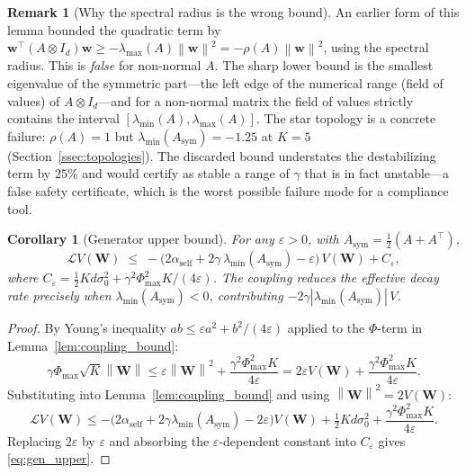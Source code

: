 \documentclass[12pt]{article}
\theoremstyle{plain}
\newtheorem{corollary}[theorem]{Corollary}
\theoremstyle{definition}
\newtheorem{remark}[theorem]{Remark}
\newcommand{\Lgen}{\mathcal{L}}
\newcommand{\W}{\mathbf{W}}
\newcommand{\norm}[1]{\left\lVert #1 \right\rVert}
\newcommand{\abs}[1]{\left| #1 \right|}
\begin{document}
\begin{remark}[Why the spectral radius is the wrong bound]
  \label{rem:fov}
  An earlier form of this lemma bounded the quadratic term by
  $\mathbf{w}^\top(A\otimes I_d)\mathbf{w}\geq-\lambda_{\max}(A)\norm{\mathbf{w}}^2
  =-\rho(A)\norm{\mathbf{w}}^2$, using the spectral radius. This is
  \emph{false} for non-normal $A$. The sharp lower bound is the smallest
  eigenvalue of the symmetric part---the left edge of the numerical range
  (field of values) of $A\otimes I_d$---and for a non-normal matrix the
  field of values strictly contains the interval
  $[\lambda_{\min}(A),\lambda_{\max}(A)]$. The star topology is a concrete
  failure: $\rho(A)=1$ but $\lambda_{\min}(A_{\mathrm{sym}})=-1.25$ at
  $K=5$ (Section~\ref{ssec:topologies}). The discarded bound understates
  the destabilizing term by $25\%$ and would certify as stable a range of
  $\gamma$ that is in fact unstable---a false safety certificate, which is
  the worst possible failure mode for a compliance tool.
\end{remark}

\begin{corollary}[Generator upper bound]
  \label{cor:gen_upper}
  For any $\varepsilon > 0$, with $A_{\mathrm{sym}}=\tfrac12(A+A^\top)$,
  \begin{equation}
    \Lgen V(\W) \;\leq\;
    -\bigl(2\alpha_{\mathrm{self}} + 2\gamma\, \lambda_{\min}(A_{\mathrm{sym}})
    - \varepsilon\bigr)\, V(\W) + C_\varepsilon,
    \label{eq:gen_upper}
  \end{equation}
  where $C_\varepsilon = \tfrac{1}{2}Kd\sigma_0^2
  + \gamma^2 \Phi_{\max}^2 K / (4\varepsilon)$.  The coupling
  \emph{reduces} the effective decay rate precisely when
  $\lambda_{\min}(A_{\mathrm{sym}})<0$, contributing
  $-2\gamma\abs{\lambda_{\min}(A_{\mathrm{sym}})}\,V$.
\end{corollary}

\begin{proof}
  By Young's inequality $ab \leq \varepsilon a^2 + b^2/(4\varepsilon)$
  applied to the $\Phi$-term in Lemma~\ref{lem:coupling_bound}:
  \[
    \gamma \Phi_{\max} \sqrt{K} \norm{\W}
    \leq \varepsilon \norm{\W}^2 + \frac{\gamma^2 \Phi_{\max}^2 K}{4\varepsilon}
    = 2\varepsilon V(\W) + \frac{\gamma^2 \Phi_{\max}^2 K}{4\varepsilon}.
  \]
  Substituting into Lemma~\ref{lem:coupling_bound} and using
  $\norm{\W}^2 = 2V(\W)$:
  \[
    \Lgen V(\W) \leq
    -\bigl(2\alpha_{\mathrm{self}} + 2\gamma \lambda_{\min}(A_{\mathrm{sym}})
    - 2\varepsilon\bigr) V(\W)
    + \tfrac{1}{2}Kd\sigma_0^2 + \frac{\gamma^2 \Phi_{\max}^2 K}{4\varepsilon}.
  \]
  Replacing $2\varepsilon$ by $\varepsilon$ and absorbing the
  $\varepsilon$-dependent constant into $C_\varepsilon$ gives
  \eqref{eq:gen_upper}.
\end{proof}
\end{document}
